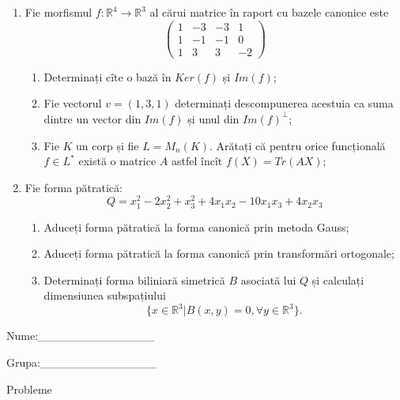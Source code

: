 \documentclass{article}
\begin{document}
\begin{enumerate}
 \item Fie morfismul $f:\mathbb{R}^4 \to \mathbb{R}^3$ al cărui matrice în raport cu bazele canonice este
$$\begin{pmatrix}
1&-3&-3&1\\
1&-1&-1&0\\
1&3&3&-2
\end{pmatrix}$$

\begin{enumerate}
\item Determinați cîte o bază în $Ker(f)$ și $Im(f)$;
\item Fie vectorul $v=(1,3,1)$ determinați descompunerea acestuia ca suma dintre un vector din $Im(f)$ și unul din $Im(f)^\perp$;
\item Fie $K$ un corp și fie $L=M_n(K)$. Arătați că pentru orice funcțională $f \in L^*$ există o matrice $A$ astfel încît $f(X)=Tr(AX)$;
\end{enumerate}
\item Fie forma pătratică:
$$Q= x_1^2-2x_2^2+x_3^2+4x_1x_2-10x_1x_3+4x_2x_3$$

\begin{enumerate}
\item Aduceți forma pătratică la forma canonică prin metoda Gauss;
\item Aduceți forma pătratică la forma canonică prin transformări ortogonale;
\item Determinați forma biliniară simetrică $B$ asociată lui $Q$ și calculați dimensiunea subspațiului
$$\{x \in \mathbb{R}^3 | B(x,y)=0,\forall y \in \mathbb{R}^3\}.$$

\end{enumerate}
\end{enumerate}
\newpage
\begin{flushright}
Nume:\_\_\_\_\_\_\_\_\_\_\_\_\_\_
 
 
Grupa:\_\_\_\_\_\_\_\_\_\_\_\_\_\_
\end{flushright}
\begin{center}
\vspace{2cm}
{\Large Probleme}
\vspace{2cm}
\end{center}
\end{document}
